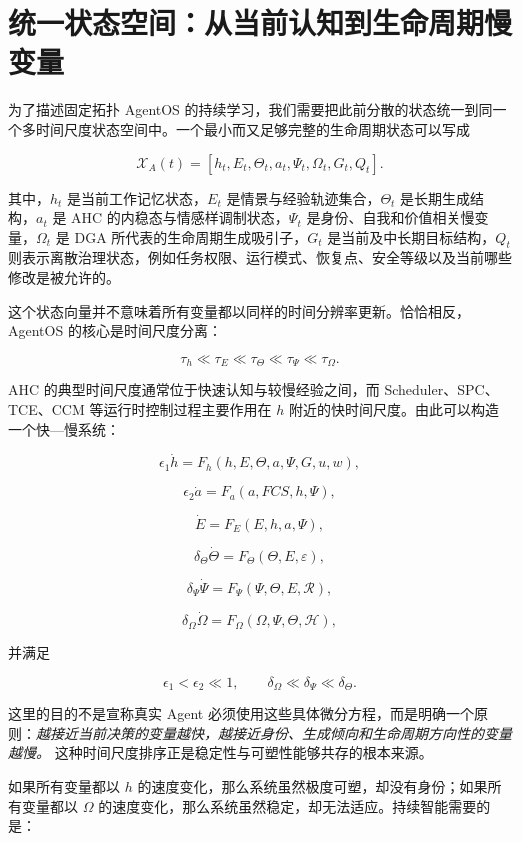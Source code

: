 \section{统一状态空间：从当前认知到生命周期慢变量}

为了描述固定拓扑 AgentOS 的持续学习，我们需要把此前分散的状态统一到同一个多时间尺度状态空间中。一个最小而又足够完整的生命周期状态可以写成

\[
\boxed{
\mathcal{X}_A(t)
=
\left[
h_t,
E_t,
\Theta_t,
a_t,
\Psi_t,
\Omega_t,
G_t,
Q_t
\right].
}
\]

其中，$h_t$ 是当前工作记忆状态，$E_t$ 是情景与经验轨迹集合，$\Theta_t$ 是长期生成结构，$a_t$ 是 AHC 的内稳态与情感样调制状态，$\Psi_t$ 是身份、自我和价值相关慢变量，$\Omega_t$ 是 DGA 所代表的生命周期生成吸引子，$G_t$ 是当前及中长期目标结构，$Q_t$ 则表示离散治理状态，例如任务权限、运行模式、恢复点、安全等级以及当前哪些修改是被允许的。

这个状态向量并不意味着所有变量都以同样的时间分辨率更新。恰恰相反，AgentOS 的核心是时间尺度分离：

\[
\boxed{
\tau_h
\ll
\tau_E
\ll
\tau_\Theta
\ll
\tau_\Psi
\ll
\tau_\Omega.
}
\]

AHC 的典型时间尺度通常位于快速认知与较慢经验之间，而 Scheduler、SPC、TCE、CCM 等运行时控制过程主要作用在 $h$ 附近的快时间尺度。由此可以构造一个快---慢系统：

\[
\epsilon_1\dot{h}
=
F_h
(h,E,\Theta,a,\Psi,G,u,w),
\]

\[
\epsilon_2\dot{a}
=
F_a
(a,FCS,h,\Psi),
\]

\[
\dot{E}
=
F_E(E,h,a,\Psi),
\]

\[
\delta_\Theta\dot{\Theta}
=
F_\Theta(\Theta,E,\varepsilon),
\]

\[
\delta_\Psi\dot{\Psi}
=
F_\Psi(\Psi,\Theta,E,\mathcal{R}),
\]

\[
\delta_\Omega\dot{\Omega}
=
F_\Omega(\Omega,\Psi,\Theta,\mathcal{H}),
\]

并满足

\[
\epsilon_1
<
\epsilon_2
\ll
1,
\qquad
\delta_\Omega
\ll
\delta_\Psi
\ll
\delta_\Theta.
\]

这里的目的不是宣称真实 Agent 必须使用这些具体微分方程，而是明确一个原则：\emph{越接近当前决策的变量越快，越接近身份、生成倾向和生命周期方向性的变量越慢。} 这种时间尺度排序正是稳定性与可塑性能够共存的根本来源。

如果所有变量都以 $h$ 的速度变化，那么系统虽然极度可塑，却没有身份；如果所有变量都以 $\Omega$ 的速度变化，那么系统虽然稳定，却无法适应。持续智能需要的是：

